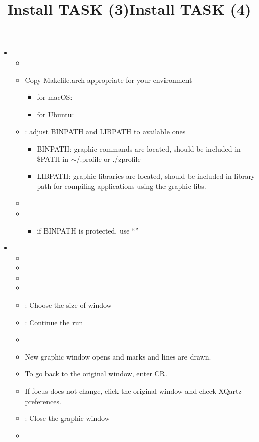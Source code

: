 \documentclass[12pt]{article}
\begin{document}
\title{Install TASK (3)}
\begin{itemize}
\item
  \begin{itemize}
  \item
  \item
    Copy Makefile.arch appropriate for your environment
    \begin{itemize}
    \item
      for macOS: 
    \item
      for Ubuntu: 
    \end{itemize}
  \item
    : adjust BINPATH and LIBPATH to available ones
    \begin{itemize}
    \item
      BINPATH: graphic commands are located, should be included in
      \$PATH in $\sim$/.profile or ./zprofile
    \item
      LIBPATH: graphic libraries are located, should be included in
      library path for compiling applications using the graphic libs.
    \end{itemize}
  \item
  \item
    \begin{itemize}
    \item
      if BINPATH is protected, use ``''
    \end{itemize}
  \end{itemize}
\end{itemize}

\title{Install TASK (4)}
\begin{itemize}
\item
  \begin{itemize}
  \item
  \item
  \item
  \item
  \item
    \qquad: Choose the size of window
  \item
    \qquad: Continue the run
  \item
  \item
    New graphic window opens and marks and lines are drawn.
  \item
    To go back to the original window, enter CR.
  \item
    If focus does not change, click the original window and check XQartz
    preferences.
  \item
    \qquad:  Close the graphic window
  \item
  \end{itemize}
\end{itemize}
\end{document}
